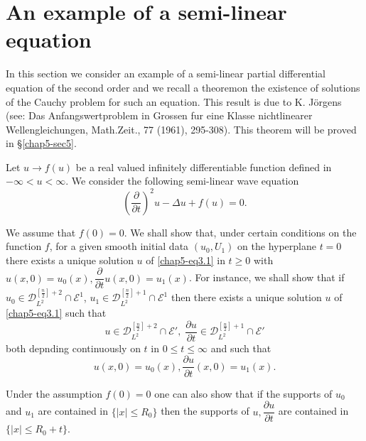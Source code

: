 \section{An example of a semi-linear equation}\label{chap5-sec3} %

In this section we consider an example of a semi-linear partial
differential equation of the second order and we recall a
theorem\pageoriginale on 
the existence of solutions of the Cauchy problem for such an
equation. This result is due to K. J\"orgens (see: Das
Anfangswertproblem in Grossen fur eine Klasse nichtlinearer
Wellengleichungen, Math.Zeit., 77 (1961), 295-308). This theorem will be
proved in \S \ref{chap5-sec5}.  

Let $u \to f(u)$ be a real valued infinitely differentiable function
defined in $- \infty < u < \infty$. We consider the following
semi-linear wave equation  
\begin{equation*}
\left(\frac{\partial}{\partial t}\right)^{2} u - \Delta u + f(u) =
0. \tag{3.1}\label{chap5-eq3.1} 
\end{equation*}

We assume that $f(0) = 0$. We shall show that, under certain
conditions on the function $f$, for a given smooth initial data
$(u_0, U_1)$ on the hyperplane $t=0$ there exists a unique solution
$u$ of \eqref{chap5-eq3.1} in $t \geq 0$ with $u(x, 0) = u_0 (x),
\dfrac{\partial}{\partial t} u (x, 0) = u_1 (x)$. For instance, we
shall show that if $u_0 \in \mathscr{D}^{\left[\frac{n}{2}\right]+2}_{L^2} \cap
\mathscr{E}^1$, $u_1 \in \mathscr{D}^{
  \left[\frac{n}{2}\right]+1}_{L^2} 
\cap \mathscr{E}^1$ then there exists a unique solution $u$ of
\eqref{chap5-eq3.1} such that  
$$
u \in \mathscr{D}^{\left[\frac{n}{2}\right]+2}_{L^2} \cap
\mathscr{E}', \; 
\frac{\partial u}{\partial t} \in
\mathscr{D}^{\left[\frac{n}{2}\right]+1}_{L^2} \cap \mathscr{E}'
$$
both depnding continuously on $t$ in $0 \leq t \leq \infty $ and such
that  
$$
u(x, 0) = u _0 (x), \frac{\partial u}{\partial t} (x, 0) = u_1 (x).  
$$

Under the assumption $f(0)=0$ one can also show that if the
supports of $u_0$ and $u_1$ are contained in $\{ |x| \leq R_0\}$ then
the supports of $u, \dfrac{\partial u}{\partial t}$ are contained in
$\{ |x| \leq R_0 + t\}$.  

